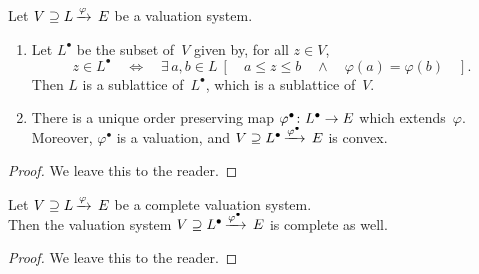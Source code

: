 \documentclass[main.tex]{subfiles}
\begin{document}
%
\begin{prop}
\label{P:convex-completion}
\label{P:convexification}
Let $V \supseteq L\,\smash{\xrightarrow{\varphi}\,E}$ be a valuation system.
\begin{enumerate}
\item
Let $L^\bullet$ be the subset of~$V$ given by,
for all $z\in V$,
\begin{equation*}
z\in L^\bullet \quad\iff\quad
\exists\, a,b\in L\ [
\quad a\leq z\leq b \quad\wedge\quad \varphi(a) = \varphi(b)\quad].
\end{equation*}
Then $L$ is a sublattice of~$L^\bullet$, which is a sublattice of~$V$.

\item
There is a unique order preserving map $\varphi^\bullet\colon L^\bullet\rightarrow E$
which extends~$\varphi$.\\
Moreover, $\varphi^\bullet$
is a valuation,
and  $V \supseteq L^\bullet\,\smash{\xrightarrow{\varphi^\bullet}\,E}$ is convex.
\end{enumerate}
\end{prop}
\begin{proof}
We leave this to the reader.
\end{proof}
%
%
%
\begin{prop}
\label{P:convexification_versus_completion}
Let $V \supseteq L\,\smash{\xrightarrow{\varphi}\,E}$ be a complete valuation system.\\
Then 
the valuation system 
$V \supseteq L^\bullet\,\smash{\xrightarrow{\varphi^\bullet}\,E}$ is complete as well.
\end{prop}
\begin{proof}
We leave this to the reader.
\end{proof}
\end{document}
